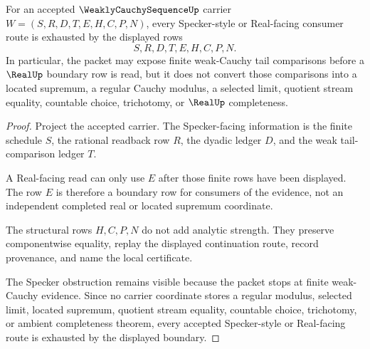 \begin{theorem}
\label{thm:weakly-cauchy-sequence-specker-boundary}
For an accepted $\WeaklyCauchySequenceUp$ carrier $W=(S,R,D,T,E,H,C,P,N)$, every Specker-style or Real-facing consumer route is exhausted by the displayed rows
$$
S,R,D,T,E,H,C,P,N .
$$
In particular, the packet may expose finite weak-Cauchy tail comparisons before a $\RealUp$ boundary row is read, but it does not convert those comparisons into a located supremum, a regular Cauchy modulus, a selected limit, quotient stream equality, countable choice, trichotomy, or $\RealUp$ completeness.
\end{theorem}
\begin{proof}
Project the accepted carrier. The Specker-facing information is the finite schedule $S$, the rational readback row $R$, the dyadic ledger $D$, and the weak tail-comparison ledger $T$.

A Real-facing read can only use $E$ after those finite rows have been displayed. The row $E$ is therefore a boundary row for consumers of the evidence, not an independent completed real or located supremum coordinate.

The structural rows $H,C,P,N$ do not add analytic strength. They preserve componentwise equality, replay the displayed continuation route, record provenance, and name the local certificate.

The Specker obstruction remains visible because the packet stops at finite weak-Cauchy evidence. Since no carrier coordinate stores a regular modulus, selected limit, located supremum, quotient stream equality, countable choice, trichotomy, or ambient completeness theorem, every accepted Specker-style or Real-facing route is exhausted by the displayed boundary.
\end{proof}



